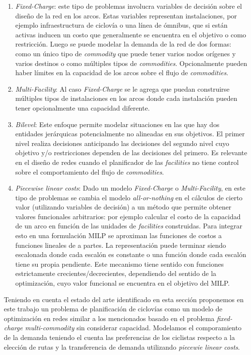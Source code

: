   \begin{enumerate}
    \item{{\it Fixed-Charge}: este tipo de problemas involucra variables de decisión sobre el diseño de la red en los arcos. Estas variables representan instalaciones, por ejemplo infraestructura de ciclovía o una línea de ómnibus, que si están activas inducen un costo que generalmente se encuentra en el objetivo o como restricción. Luego se puede modelar la demanda de la red de dos formas: como un único tipo de {\it commodity} que puede tener varios nodos orígenes y varios destinos o como múltiples tipos de {\it commodities}. Opcionalmente pueden haber límites en la capacidad de los arcos sobre el flujo de {\it commodities}.}
    \item{{\it Multi-Facility}: Al caso {\it Fixed-Charge} se le agrega que puedan construirse múltiples tipos de instalaciones en los arcos donde cada instalación pueden tener opcionalmente una capacidad diferente.}
    \item{{\it Bilevel}: Este enfoque permite modelar situaciones en las que hay dos entidades jerárquicas potencialmente no alineadas en sus objetivos. El primer nivel realiza decisiones anticipando las decisiones del segundo nivel cuyo objetivo y/o restricciones dependen de las decisiones del primero. Es relevante en el diseño de redes cuando el planificador de las {\it facilities} no tiene control sobre el comportamiento del flujo de {\it commodities}.}
    \item{{\it Piecewise linear costs}: Dado un modelo {\it Fixed-Charge} o {\it Multi-Facility}, en este tipo de problemas se cambia el modelo {\it all-or-nothing} en el cálculos de cierto valor (utilizando variables de decisión) a un método que permite obtener valores funcionales arbitrarios: por ejemplo calcular el costo de la capacidad de un arco en función de las unidades de {\it facilities} construidas. Para integrar esto en una formulación MILP se aproximan las funciones de costos a funciones lineales de a partes. La representación puede terminar siendo escalonada donde cada escalón es constante o una función donde cada escalón tiene su propia pendiente. Este mecanismo tiene sentido con funciones estrictamente crecientes/decrecientes, dependiendo del sentido de la optimización, cuyo valor funcional se encuentra en el objetivo del MILP.}
  \end{enumerate}

  Teniendo en cuenta el estado del arte identificado en esta sección proponemos en este trabajo un problema de planificación de ciclovías como un modelo de optimización en redes similar a los mencionados basado en el problema {\it fixed-charge multi-commodity} sin considerar capacidad. Modelamos el comporamiento de la demanda teniendo el cuenta las preferencias de los ciclistas respecto a la elección de rutas y la transferencia de demanda utilizando {\it piecewie linear costs}.

